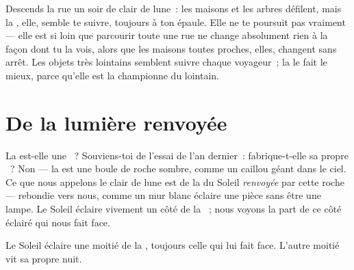 \begin{example}\label{ex:g2:moon-in-the-sky:follows}
Descends la rue un soir de clair de lune~: les maisons et les arbres
défilent, mais la , elle, semble te suivre, toujours à ton
épaule. Elle ne te poursuit pas vraiment --- elle est si loin que
parcourir toute une rue ne change absolument rien à la façon dont tu
la vois, alors que les maisons toutes proches, elles, changent sans
arrêt. Les objets très lointains semblent suivre chaque voyageur~; la
 le fait le mieux, parce qu'elle est la championne du lointain.
\end{example}

\section{De la lumière renvoyée}

\begin{example}\label{ex:g2:moon-in-the-sky:borrowed}
La  est-elle une ~? Souviens-toi de l'essai de
l'an dernier~: fabrique-t-elle sa propre ~? Non --- la 
est une boule de roche sombre, comme un caillou géant dans le ciel.
Ce que nous appelons le clair de lune est de la  du Soleil
\emph{renvoyée} par cette roche --- rebondie vers nous, comme un mur
blanc éclaire une pièce sans être une lampe. Le Soleil éclaire
vivement un côté de la ~; nous voyons la part de ce côté éclairé
qui nous fait face.
\end{example}

\begin{omfigure}

{\small Le Soleil éclaire une moitié de la , toujours celle qui
lui fait face. L'autre moitié vit sa propre nuit.}
\end{omfigure}

